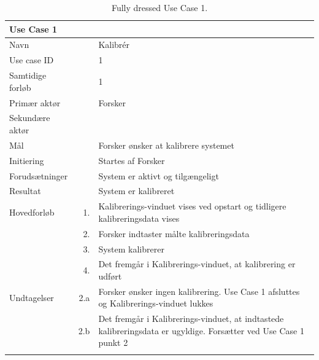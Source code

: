 \begin{longtabu} to  %
    {\large \textbf{Use Case 1}} && \\
    \toprule
    Navn &&    Kalibrér\\
    Use case ID &&    1\\
    Samtidige forløb &&    1\\
    Primær aktør &&    Forsker\\
    Sekundære aktør &&	 \\
    Mål &&    Forsker ønsker at kalibrere systemet\\
    Initiering &&	Startes af Forsker\\
    Forudsætninger &&  System er aktivt og tilgængeligt\\
    Resultat &&		System er kalibreret                         \\ \midrule
    Hovedforløb &    1. &	 Kalibrerings-vinduet vises ved opstart og 					tidligere kalibreringsdata vises\\[-1ex]  
    			&	 2. &	 Forsker indtaster målte kalibreringsdata    			\\
                &    3.	&	 System kalibrerer\\
                &	 4. &	 Det fremgår i Kalibrerings-vinduet, at kalibrering er udført \newline\\ \midrule
                
    Undtagelser &    2.a &   Forsker ønsker ingen kalibrering. Use Case 1 afsluttes og Kalibrerings-vinduet lukkes  \\
    			&	 2.b &	 Det fremgår i Kalibrerings-vinduet, at indtastede kalibreringsdata er ugyldige. Forsætter ved Use Case 1 punkt 2  \\ \bottomrule
\caption{Fully dressed Use Case 1.}
\label{UC1}
\end{longtabu}


